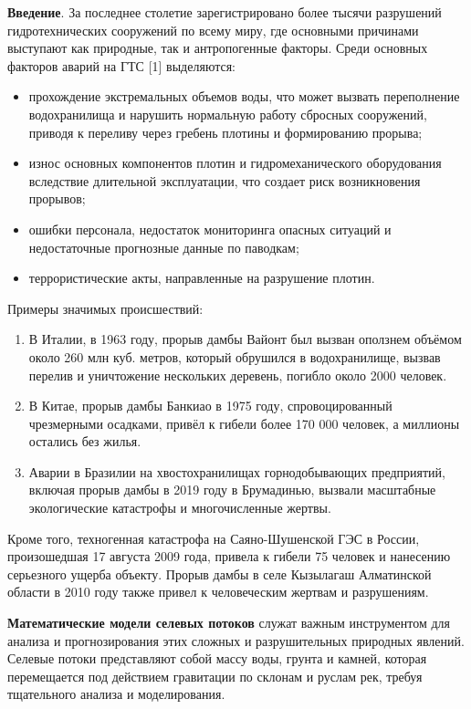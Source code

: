\begin{multicols}{2}
{\bfseries Введение}. За последнее столетие зарегистрировано более тысячи
разрушений гидротехнических сооружений по всему миру, где основными
причинами выступают как природные, так и антропогенные факторы. Среди
основных факторов аварий на ГТС {[}1{]} выделяются:

\begin{itemize}[leftmargin=*]
\item
  прохождение экстремальных объемов воды, что может вызвать переполнение
  водохранилища и нарушить нормальную работу сбросных сооружений,
  приводя к переливу через гребень плотины и формированию прорыва;
\item
  износ основных компонентов плотин и гидромеханического оборудования
  вследствие длительной эксплуатации, что создает риск возникновения
  прорывов;
\item
  ошибки персонала, недостаток мониторинга опасных ситуаций и
  недостаточные прогнозные данные по паводкам;
\item
  террористические акты, направленные на разрушение плотин.
\end{itemize}

Примеры значимых происшествий:

\begin{enumerate}[leftmargin=*]
\def\labelenumi{\arabic{enumi}.}
\item
  В Италии, в 1963 году, прорыв дамбы Вайонт был вызван оползнем объёмом
  около 260 млн куб. метров, который обрушился в водохранилище, вызвав
  перелив и уничтожение нескольких деревень, погибло около 2000 человек.
\item
  В Китае, прорыв дамбы Банкиао в 1975 году, спровоцированный
  чрезмерными осадками, привёл к гибели более 170 000 человек, а
  миллионы остались без жилья.
\item
  Аварии в Бразилии на хвостохранилищах горнодобывающих предприятий,
  включая прорыв дамбы в 2019 году в Брумадинью, вызвали масштабные
  экологические катастрофы и многочисленные жертвы.
\end{enumerate}

Кроме того, техногенная катастрофа на Саяно-Шушенской ГЭС в России,
произошедшая 17 августа 2009 года, привела к гибели 75 человек и
нанесению серьезного ущерба объекту. Прорыв дамбы в селе Кызылагаш
Алматинской области в 2010 году также привел к человеческим жертвам и
разрушениям.

{\bfseries Математические модели селевых потоков} служат важным
инструментом для анализа и прогнозирования этих сложных и разрушительных
природных явлений. Селевые потоки представляют собой массу воды, грунта
и камней, которая перемещается под действием гравитации по склонам и
руслам рек, требуя тщательного анализа и моделирования.


\end{multicols}

